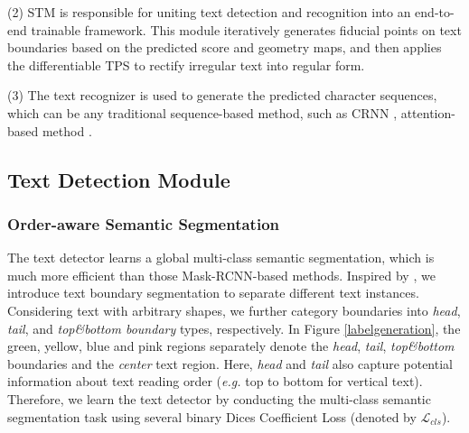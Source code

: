 \documentclass[letterpaper]{article} \usepackage{aaai20}  \usepackage{times}  \usepackage{helvet} \usepackage{courier}  \usepackage[hyphens]{url}  \usepackage{graphicx} \urlstyle{rm} \def\UrlFont{\rm}  \usepackage{graphicx}  \frenchspacing  \setlength{\pdfpagewidth}{8.5in}  \setlength{\pdfpageheight}{11in}  \usepackage{amsmath}
\begin{document}
(2) STM is responsible for uniting text detection and recognition into an end-to-end trainable framework.
This module iteratively generates fiducial points on text boundaries based on the predicted score and geometry maps, and then applies the differentiable TPS to rectify irregular text into regular form.

(3) The text recognizer is used to generate the predicted character sequences, which can be any traditional sequence-based method, such as CRNN \cite{shi2017end}, attention-based method \cite{cheng2017focus}.

\subsection{Text Detection Module}
\subsubsection{Order-aware Semantic Segmentation}
The text detector learns a global multi-class semantic segmentation, which is much more efficient than those Mask-RCNN-based methods.
Inspired by \cite{xue2018accurate}, we introduce text boundary segmentation to separate different text instances.
Considering text with arbitrary shapes, we further category boundaries into \emph{head}, \emph{tail}, and \emph{top\&bottom boundary} types, respectively.
In Figure \ref{labelgeneration}, the green, yellow, blue and pink regions separately denote the \emph{head}, \emph{tail}, \emph{top\&bottom} boundaries and the \emph{center} text region.
Here, \emph{head} and \emph{tail} also capture potential information about text reading order (\emph{e.g.} top to bottom for vertical text).
Therefore, we learn the text detector by conducting the multi-class semantic segmentation task using several binary Dices Coefficient Loss \cite{milletari2016v} (denoted by $\mathcal{L}_{cls}$).
\end{document}
